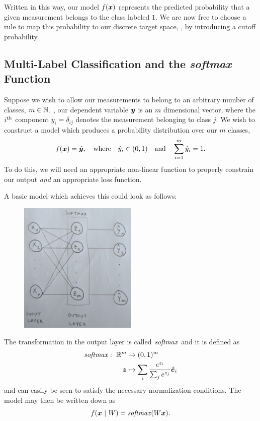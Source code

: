 Written in this way, our model $f(\bm{x})$ represents the predicted probability that a given measurement belongs to the class labeled $1$.
We are now free to choose a rule to map this probability to our discrete target space, \eg, by introducing a cutoff probability. 

%
%
\subsection{Multi-Label Classification and the \textit{softmax} Function}
%
%
Suppose we wish to allow our measurements to belong to an arbitrary number of classes, $m \in \mathbb{N}$, \ie, our dependent variable $\bm{y}$ is an $m$ dimensional vector, where the $i^{\rm th}$ component $y_i = \delta_{ij}$ denotes the measurement belonging to class $j$.
We wish to construct a model which produces a probability distribution over our $m$ classes,
%
\begin{equation}
    f(\bm{x}) = \hat{\bm{y}}, \quad \text{where}\quad \hat{y}_i \in (0, 1)\quad \text{and}\quad \sum_{i=1}^m \hat{y}_i = 1.
\end{equation}
%
To do this, we will need an appropriate non-linear function to properly constrain our output \textit{and} an appropriate loss function.

A basic model which achieves this could look as follows:
%
\begin{figure}[H]
    \centering
    \includegraphics[width=0.5\textwidth]{../figures/chapter_01/nn_diagram_multilabel_classifier.png}
\end{figure}
%
The transformation in the output layer is called $\operatorname*{\text{\textit{softmax}}}$ and it is defined as
%
\begin{align}
    \operatorname*{\text{\textit{softmax}}}: ~\mathbb{R}^m &\rightarrow (0, 1)^m \nonumber\\
              ~\bm{z}   &\mapsto \sum_i \frac{e^{z_i}}{\sum_j e^{z_j}} \hat{\bm{e}}_i
\end{align}
%
and can easily be seen to satisfy the necessary normalization conditions.
The model may then be written down as
%
\begin{equation}
    f(\bm{x} ~|~ W) = \operatorname*{\text{\textit{softmax}}}(W \bm{x}).
\end{equation}
%

